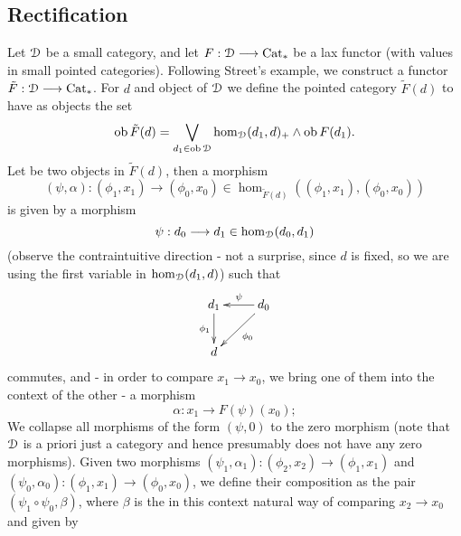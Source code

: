   \subsection{Rectification}
    \begin{defn}\label{def_streets_first_construction_functor}
      Let $\mathcal{D}$ be a small category, and let $F: \mathcal{D} \longrightarrow \mathrm{Cat}_*$ be a lax functor (with values in small pointed categories).
      Following Street's example, we construct a functor $\tilde{F}: \mathcal{D} \longrightarrow \mathrm{Cat}_*$.
      For $d$ and object of $\mathcal{D}$ we define the pointed category $\tilde{F}(d)$ to have as objects the set 
      \begin{displaymath}
        \operatorname{ob} \tilde{F}(d) = \bigvee_{d_1 \in \operatorname{ob} \mathcal{D}} \operatorname{hom}_{\mathcal{D}}(d_1,d)_+ \wedge \operatorname{ob} F(d_1).
      \end{displaymath}
      Let 
      be two objects in $\tilde{F}(d)$, then a morphism 
      \begin{displaymath}
        (\psi, \alpha) \colon (\phi_1,x_1) \to (\phi_0,x_0) \in \hom_{\tilde{F}(d)}((\phi_1,x_1), (\phi_0,x_0))
      \end{displaymath}  
      is given by a morphism 
      \begin{displaymath}
        \psi: d_0 \longrightarrow d_1 \in \operatorname{hom}_{\mathcal{D}}(d_0,d_1)
      \end{displaymath}  
      (observe the contraintuitive direction - not a surprise, since $d$ is fixed, so we are using the first variable in $\operatorname{hom}_{\mathcal{D}}(d_1,d)$) such that 
      \begin{displaymath}
        \xymatrix{
          d_1 \ar[d]_{\phi_1} & d_0 \ar[l]_{\psi} \ar[dl]^{\phi_0} \\
          d
        }
      \end{displaymath}  
      commutes, and - in order to compare $x_1 \to x_0$, we bring one of them into the context of the other - a morphism 
      \begin{displaymath}
        \alpha \colon x_1 \to F(\psi)(x_0);
      \end{displaymath}  
      We collapse all morphisms of the form $(\psi,0)$ to the zero morphism (note that $\mathcal{D}$ is a priori just a category and hence presumably does not have any zero morphisms).
      Given two morphisms $(\psi_1,\alpha_1)\colon(\phi_2,x_2) \to (\phi_1,x_1)$ and $(\psi_0,\alpha_0)\colon(\phi_1,x_1) \to (\phi_0,x_0)$, we define their composition as the pair $(\psi_1 \circ \psi_0, \beta)$, where $\beta$ is the in this context natural way of comparing $x_2 \to x_0$ and given by
      \begin{displaymath}

\end{displaymath}
\end{defn}
